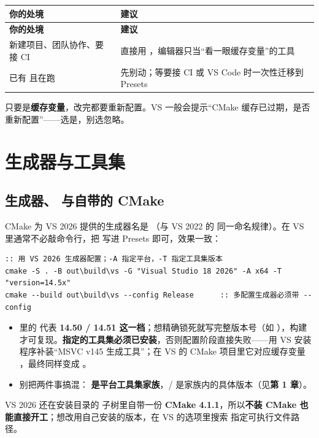 \begin{longtable}{L{5.6cm}L{9.4cm}}
\toprule \textbf{你的处境} & \textbf{建议} \\ \midrule
\endfirsthead
\toprule \textbf{你的处境} & \textbf{建议} \\ \midrule
\endhead
\bottomrule \endlastfoot
新建项目、团队协作、要接 CI & 直接用 ，编辑器只当“看一眼缓存变量”的工具 \\
已有  且在跑 & 先别动；等要接 CI 或 VS Code 时一次性迁移到 Presets \\
\end{longtable}
\begin{tipbox}[提示]
只要是\textbf{缓存变量}，改完都要重新配置。VS 一般会提示“CMake 缓存已过期，是否重新配置”——选是，别选忽略。
\end{tipbox}

\section{生成器与工具集}
\subsection{ 生成器、 与自带的 CMake}
CMake 为 VS 2026 提供的生成器名是 \textbf{}（与 VS 2022 的  同一命名规律）。在 VS 里通常不必敲命令行，把  写进 Presets 即可，效果一致：

\begin{lstlisting}[style=shellstyle]
:: 用 VS 2026 生成器配置；-A 指定平台，-T 指定工具集版本
cmake -S . -B out\build\vs -G "Visual Studio 18 2026" -A x64 -T "version=14.5x"
cmake --build out\build\vs --config Release      :: 多配置生成器必须带 --config
\end{lstlisting}
\begin{itemize}
  \item {} 里的  代表 \textbf{14.50 / 14.51 这一档}；想精确锁死就写完整版本号（如 ），构建才可复现。\textbf{指定的工具集必须已安装}，否则配置阶段直接失败——用 VS 安装程序补装“MSVC v145 生成工具”；在 VS 的 CMake 项目里它对应缓存变量 \textbf{}，最终同样变成 。
  \item 别把两件事搞混：\textbf{ 是平台工具集家族}，/ 是家族内的具体版本（见\textbf{第 1 章}）。
\end{itemize}
VS 2026 还在安装目录的  子树里自带一份 \textbf{CMake 4.1.1}，所以\textbf{不装 CMake 也能直接开工}；想改用自己安装的版本，在 VS 的选项里搜索  指定可执行文件路径。

